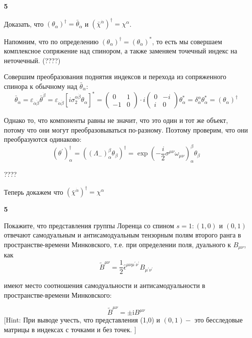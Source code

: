 \documentclass[a4paper,12pt]{article} %
\begin{document}
\begin{task}\textbf{5}

Доказать, что	
$\left(\theta_{\alpha}\right)^{\dagger}=\bar{\theta}_{\dot{\alpha}}$ и 
$\left(\bar{\chi}^{\dot{\alpha}}\right)^{\dagger}=\chi^{\alpha}$.

Напомним, что по определению $ \left(\theta_{\alpha}\right)^{\dagger}=\left(\theta_{\dot{\alpha}}\right)^{*}$, 
то есть мы совершаем комплексное сопряжение над спинором, а также заменяем точечный индекс на неточечный.
(????)

Совершим преобразования поднятия индексов и перехода из сопряженного спинора к обычному над $\bar{\theta}_{\dot{\alpha}}$:
\[ \bar{\theta}_{\dot{\alpha}}=\varepsilon_{\dot{\alpha}\dot{\beta}}\bar{\theta}^{\dot{\beta}}= 
\varepsilon_{\dot{\alpha}\dot{\beta}}[i\sigma_2^{\alpha\dot{\beta}} \theta_\alpha]^{*}=
\left(\begin{array}{cc}
	{0} & {1} \\ {-1} & {0}
\end{array}\right) \cdot i
\left(\begin{array}{cc}
	{0} & {-i} \\ {i} & {0}
\end{array}\right)\theta_\alpha^{*}=
\delta_{\dot{\alpha}}^{\alpha}\theta_\alpha^{*}= (\theta_\alpha)^{\dagger}
\]

Однако то, что компоненты равны не значит, что это один и тот же объект, потому что они могут преобразовываться по-разному.
Поэтому проверим, что они преобразуются одинаково:
\[ (\theta^\prime)^\dagger_\alpha=
((\Lambda_{-})^\beta_\alpha \theta_\beta)^\dagger=
\exp \left(-\frac{i}{2}\sigma^{\mu\nu}\omega_{\mu\nu}\right)^\beta_\alpha \theta_\beta \]

????



Теперь докажем что $\left(\bar{\chi}^{\dot{\alpha}}\right)^{\dagger}=\chi^{\alpha}$









\end{task}



\begin{task}\textbf{5}

Покажите, что представления группы Лоренца со спином $s = 1:
(1, 0)$ и $(0, 1)$ отвечают самодуальным и антисамодуальным 
тензорным полям второго ранга в пространстве-времени Минковского, т.е. при
определении поля, дуального к $ B_{\mu\nu}$, как
$$
\tilde{B}^{\mu \nu}=\frac{1}{2} \hat{\epsilon}^{\mu \nu \mu^{\prime} \nu^{\prime}} B_{\mu^{\prime} \nu^{\prime}}
$$

имеют место соотношения самодуальности и антисамодуальности в
пространстве-времени Минковского:

$$
\tilde{B}^{\mu \nu}=\pm \mathrm{i} B^{\mu \nu}
$$
[Hint: При выводе учесть, что представления (1,0) и $(0,1)-$ это бесследовые матрицы в индексах с точками и без точек. $]$







\end{task}
\end{document}
